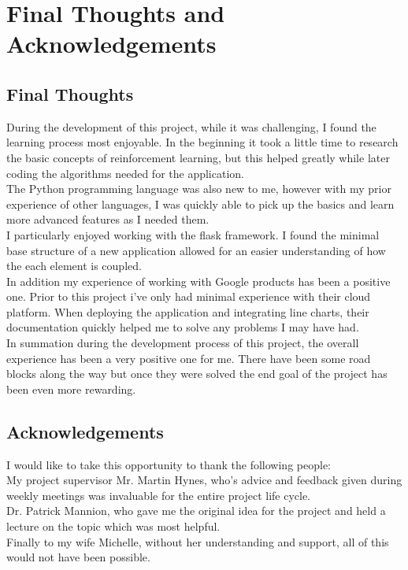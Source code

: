 \section{Final Thoughts and Acknowledgements}
\subsection{Final Thoughts}
During the development of this project, while it was challenging, I found the learning process most enjoyable. In the beginning it took a little time to research the basic concepts of reinforcement learning, but this helped greatly while later coding the algorithms needed for the application.\\
The Python programming language was also new to me, however with my prior experience of other languages, I was quickly able to pick up the basics and learn more advanced features as I needed them.\\
I particularly enjoyed working with the flask framework. I found the minimal base structure of a new application allowed for an easier understanding of how the each element is coupled.\\
In addition my experience of working with Google products has been a positive one. Prior to this project i've only had minimal experience with their cloud platform. When deploying the application and integrating line charts, their documentation quickly helped me to solve any problems I may have had.\\
In summation during the development process of this project, the overall experience has been a very positive one for me. There have been some road blocks along the way but once they were solved the end goal of the project has been even more rewarding.
\subsection{Acknowledgements}
I would like to take this opportunity to thank the following people:\\
My project supervisor Mr. Martin Hynes, who's advice and feedback given during weekly meetings was invaluable for the entire project life cycle.\\
Dr. Patrick Mannion, who gave me the original idea for the project and held a lecture on the topic which was most helpful.\\
Finally to my wife Michelle, without her understanding and support, all of this would not have been possible.\\\\
\appendix
